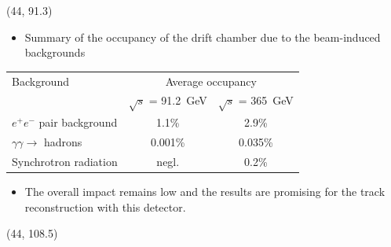 \documentclass[final,xcolor={dvipsnames,svgnames,x11names,table}]{beamer}
\begin{document}
\begin{frame}
\begin{textblock}{43}
\begin{tcolorbox}[title=Beam-induced backgrounds and the impact on the drift chamber]
\begin{columns}
  \end{columns}

  \end{tcolorbox}
\end{textblock}

 \begin{textblock}{39.5}(44, 91.3)
   \begin{tcolorbox}[title=Conclusions]

  \vspace{0.3cm}

   \begin{itemize}
     \item Summary of the occupancy of the drift chamber due to the beam-induced backgrounds \vspace{0.5cm}
   \end{itemize}
   \centering
   \begin{adjustbox}{max width=\textwidth}
     \begin{tabular}{l c c}
       \toprule
        Background & \multicolumn{2}{c}{Average occupancy} \\
         & $\sqrt{s}$ = 91.2~GeV & $\sqrt{s}$ = 365~GeV \\
        \midrule
        $e^+e^-$ pair background & 1.1\% & 2.9\% \\
        $\gamma\gamma\rightarrow$ hadrons & 0.001\% & 0.035\%  \\
        Synchrotron radiation & negl. & 0.2\% \\
        \bottomrule
     \end{tabular}
   \end{adjustbox}

   \vspace{0.8cm}

   \begin{itemize}
    \item The overall impact remains low and the results are promising for the track reconstruction with this detector.
   \end{itemize}

   \vspace{0.5cm}

  \end{tcolorbox}
 \end{textblock}

 \begin{textblock}{39.5}(44, 108.5)
   \begin{tcolorbox}[title=References]

   \printbibliography

  \end{tcolorbox}
 \end{textblock}

\end{frame}
\end{document}
